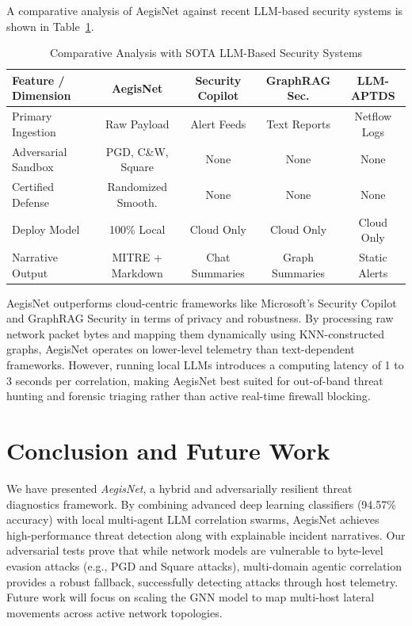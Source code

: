 \documentclass[journal,twoside]{IEEEtran}
\begin{document}
A comparative analysis of AegisNet against recent LLM-based security systems is shown in Table~\ref{tab:sota_comparison}.

\begin{table}[htbp]
\caption{Comparative Analysis with SOTA LLM-Based Security Systems}
\label{tab:sota_comparison}
\centering
\begin{tabular}{lcccc}
\toprule
\textbf{Feature / Dimension} & \textbf{AegisNet} & \textbf{Security Copilot} & \textbf{GraphRAG Sec.} & \textbf{LLM-APTDS} \\
\midrule
Primary Ingestion & Raw Payload & Alert Feeds & Text Reports & Netflow Logs \\
Adversarial Sandbox & PGD, C\&W, Square & None & None & None \\
Certified Defense & Randomized Smooth. & None & None & None \\
Deploy Model & 100\% Local & Cloud Only & Cloud Only & Cloud Only \\
Narrative Output & MITRE + Markdown & Chat Summaries & Graph Summaries & Static Alerts \\
\bottomrule
\end{tabular}
\end{table}

AegisNet outperforms cloud-centric frameworks like Microsoft's Security Copilot and GraphRAG Security in terms of privacy and robustness. By processing raw network packet bytes and mapping them dynamically using KNN-constructed graphs, AegisNet operates on lower-level telemetry than text-dependent frameworks. However, running local LLMs introduces a computing latency of 1 to 3 seconds per correlation, making AegisNet best suited for out-of-band threat hunting and forensic triaging rather than active real-time firewall blocking.

\section{Conclusion and Future Work}
\label{sec:conclusion}
We have presented \textit{AegisNet}, a hybrid and adversarially resilient threat diagnostics framework. By combining advanced deep learning classifiers (94.57\% accuracy) with local multi-agent LLM correlation swarms, AegisNet achieves high-performance threat detection along with explainable incident narratives. Our adversarial tests prove that while network models are vulnerable to byte-level evasion attacks (e.g., PGD and Square attacks), multi-domain agentic correlation provides a robust fallback, successfully detecting attacks through host telemetry. Future work will focus on scaling the GNN model to map multi-host lateral movements across active network topologies.
\end{document}
